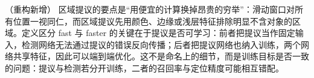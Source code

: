 \documentclass[../../main.tex]{subfiles}
\begin{document}
\begin{remark}（重构新增）
区域提议的要点是“用便宜的计算换掉昂贵的穷举”：滑动窗口对所有位置一视同仁，而区域提议先用颜色、边缘或浅层特征排除明显不含对象的区域。定义区分 fast 与 faster 的关键在于提议是否可学习：前者把提议当作固定输入，检测网络无法通过提议的错误反向传播；后者把提议网络也纳入训练，两个网络共享特征，因此可以端到端优化。这不是命名上的细节，而是训练目标是否一致的问题：提议与检测若分开训练，二者的召回率与定位精度可能相互错配。
\end{remark}
\end{document}
